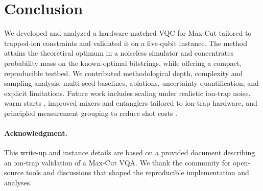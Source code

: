 \section{Conclusion}
We developed and analyzed a hardware-matched VQC for Max-Cut tailored to trapped-ion constraints and validated it on a five-qubit instance. The method attains the theoretical optimum in a noiseless simulator and concentrates probability mass on the known-optimal bitstrings, while offering a compact, reproducible testbed. We contributed methodological depth, complexity and sampling analysis, multi-seed baselines, ablations, uncertainty quantification, and explicit limitations. Future work includes scaling under realistic ion-trap noise, warm starts \cite{egger2021warmstart}, improved mixers and entanglers tailored to ion-trap hardware, and principled measurement grouping to reduce shot costs \cite{huggins2021efficient,verteletskyi2020measurement}.

\paragraph{Acknowledgment.} This write-up and instance details are based on a provided document describing an ion-trap validation of a Max-Cut VQA. We thank the community for open-source tools and discussions that shaped the reproducible implementation and analyses.





